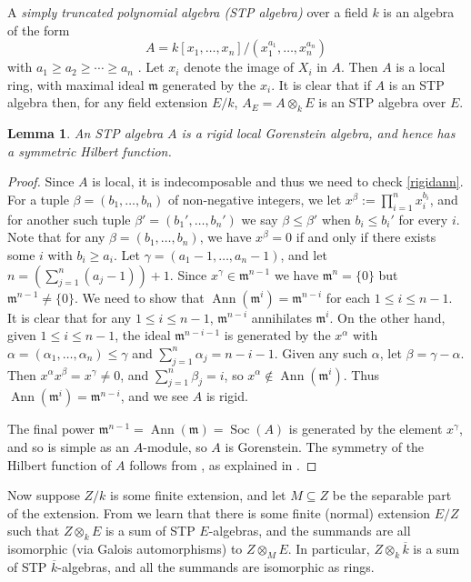 \documentclass[11pt,reqno]{amsart}
\newtheorem{lemma}{Lemma}[subsection]
\theoremstyle{definition}
\theoremstyle{remark}
\theoremstyle{definition}
\theoremstyle{plain}
\DeclareMathOperator{\Soc}{Soc}
\DeclareMathOperator{\Ann}{Ann}
\newcommand{\m}{\mathfrak{m}}
\newcommand{\bark}{{\overline{k}}}
\begin{document}
A \emph{simply truncated polynomial algebra (STP algebra)} over a field $k$ is an algebra of the form
$$
A=k[x_1,\ldots,x_n]/(x_1^{a_1},\ldots,x_n^{a_n})
$$
with $a_1\geq a_2 \geq \cdots\geq a_n$ \cite[Ch. 1]{rasala}.
Let $x_i$ denote the image of $X_i$ in $A$.
Then $A$ is a local ring, with maximal ideal $\m$ generated by the $x_i$.
It is clear that if $A$ is an STP algebra then, for any field extension $E/k$, $A_E = A\otimes_k E$ is an STP algebra over $E$.

\begin{lemma}\label{rigidSTP}
An STP algebra $A$ is a rigid local Gorenstein algebra, and hence has a symmetric Hilbert function.
\end{lemma}

\begin{proof}
Since $A$ is local, it is indecomposable and thus we need to check \eqref{rigidann}.
For a tuple $\beta = (b_1,\ldots,b_n)$ of non-negative integers, we let $x^\beta := \prod_{i=1}^n x_i^{b_i}$,
and for another such tuple $\beta' = (b_1',\ldots,b_n')$ we say $\beta\leq \beta'$ when $b_i\leq b_i'$ for every $i$.  
Note that for any $\beta = (b_1,\ldots,b_n)$, we have $x^\beta = 0$ if and only if there exists some $i$ with $b_i\geq a_i$.
Let $\gamma = (a_1-1,\ldots,a_n-1)$, and let $n = \left(\sum_{j=1}^n (a_j-1)\right) + 1$.
Since $x^\gamma\in\m^{n-1}$ we have $\m^n = \{0\}$ but $\m^{n-1}\neq \{0\}$.
We need to show that $\Ann(\m^i) = \m^{n-i}$ for each $1\leq i\leq n-1$.
It is clear that for any $1\leq i\leq n-1$, $\m^{n-i}$ annihilates $\m^i$.
On the other hand, given $1\leq i\leq n-1$, the ideal $\m^{n-i-1}$ is generated by the $x^\alpha$ with $\alpha=(\alpha_1,\ldots,\alpha_n) \leq \gamma$ and $\sum_{j=1}^n \alpha_j = n-i-1$.
Given any such $\alpha$, let $\beta = \gamma-\alpha$.
Then $x^\alpha x^\beta = x^\gamma \neq 0$, and $\sum_{j=1}^n \beta_j = i$, so $x^\alpha \not\in \Ann(\m^i)$.
Thus $\Ann(\m^i) = \m^{n-i}$, and we see $A$ is rigid.

The final power $\m^{n-1} = \Ann(\m) = \Soc(A)$ is generated by the element $x^\gamma$, and so is simple as an $A$-module, so $A$ is Gorenstein.
The symmetry of the Hilbert function of $A$ follows from \cite[\S70]{Mac}, as explained in .
\end{proof}

Now suppose $Z/k$ is some finite extension, and let $M\subseteq Z$ be the separable part of the extension.
From \cite[Ch.~2, Thm.~6]{rasala} we learn that there is some finite (normal) extension $E/Z$ such that $Z\otimes_k E$ is a sum of STP $E$-algebras, and the summands are all isomorphic (via Galois automorphisms) to $Z\otimes_M E$.
In particular, $Z\otimes_k \bark$ is a sum of STP $\bark$-algebras, and all the summands are isomorphic as rings.
\end{document}
